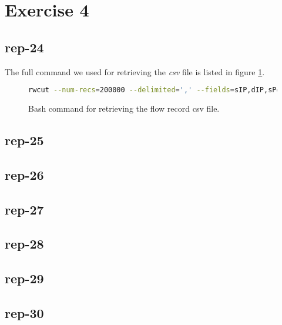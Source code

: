\section*{Exercise 4}
\subsection*{rep-24}
The full command we used for retrieving the \textit{csv} file is listed in figure \ref{fig:bash-flowrec}.
\begin{figure}[H]
\begin{lstlisting}[language=bash]
rwcut --num-recs=200000 --delimited=',' --fields=sIP,dIP,sPort,dPort,protocol,flags,ttl,bytes team16.flowrecord.rw > team16_flowrecord.csv
\end{lstlisting}
\caption{Bash command for retrieving the flow record csv file.}
\label{fig:bash-flowrec}
\end{figure}
\subsection*{rep-25}

\subsection*{rep-26}

\subsection*{rep-27}

\subsection*{rep-28}

\subsection*{rep-29}

\subsection*{rep-30}
